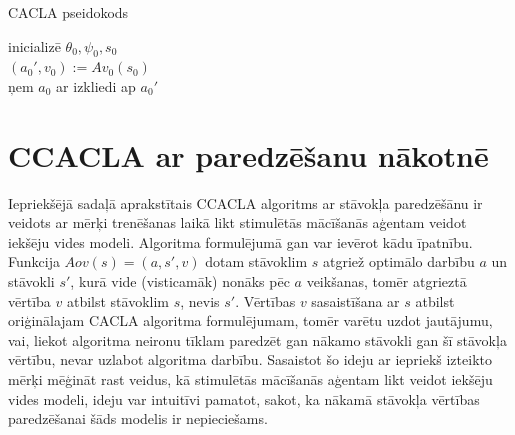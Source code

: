 \documentclass{ludis} %
\begin{document}
\begin{spacing}{1}
\begin{algorithm}
\caption{CACLA pseidokods}\label{alg:ccacla-state}
inicializē $\theta_0, \psi_0, s_0$ \\
$(a_0', v_0) := Av_0(s_0)$ \\
ņem $a_0$ ar izkliedi ap $a_0'$ \\
\end{algorithm}
\end{spacing}

\section{CCACLA ar paredzēšanu nākotnē}
Iepriekšējā sadaļā aprakstītais CCACLA algoritms ar stāvokļa paredzēšānu ir
veidots ar mērķi trenēšanas laikā likt stimulētās mācīšanās aģentam veidot
iekšēju vides modeli. Algoritma formulējumā gan var ievērot kādu īpatnību.
Funkcija $Aov(s) = (a, s', v)$ dotam stāvoklim $s$ atgriež optimālo darbību $a$
un stāvokli $s'$, kurā vide (visticamāk) nonāks pēc $a$ veikšanas, tomēr
atgrieztā vērtība $v$ atbilst stāvoklim $s$, nevis $s'$. Vērtības $v$
sasaistīšana ar $s$ atbilst oriģinālajam CACLA algoritma formulējumam, tomēr
varētu uzdot jautājumu, vai, liekot algoritma neironu tīklam paredzēt gan nākamo
stāvokli gan šī stāvokļa vērtību, nevar uzlabot algoritma darbību. Sasaistot šo
ideju ar iepriekš izteikto mērķi mēģināt rast veidus, kā stimulētās mācīšanās
aģentam likt veidot iekšēju vides modeli, ideju var intuitīvi pamatot, sakot, ka
nākamā stāvokļa vērtības paredzēšanai šāds modelis ir nepieciešams.
\end{document}
